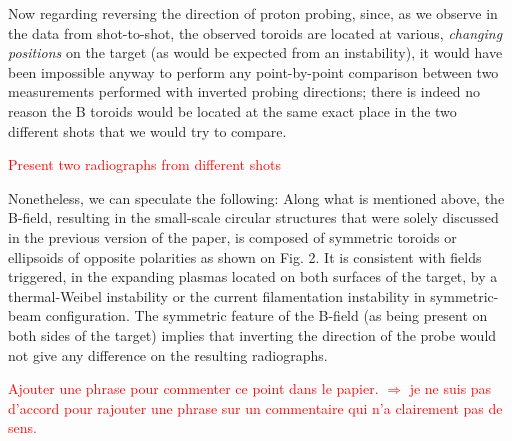 \documentclass{article}
\begin{document}
\begin{enumerate}
Now regarding  reversing the direction of proton probing,
%
since, as we observe in the data from shot-to-shot, the observed toroids are located at various, \emph{changing positions} on the target (as would be expected from an instability), it would have been impossible anyway to perform any point-by-point comparison between two measurements performed with inverted probing directions; there is indeed no reason the B toroids would be located at the same exact place in the two different shots that we would try to compare.

\textcolor{red}{Present two radiographs from different shots}

Nonetheless, we can speculate the following: Along what is mentioned above, the B-field, resulting in the small-scale circular structures that were solely discussed in the previous version of the paper, is composed of symmetric toroids or ellipsoids of opposite polarities as shown on Fig. 2. 
It is consistent with fields triggered, in the expanding plasmas located on both surfaces of the target, by a thermal-Weibel instability or the current filamentation instability in symmetric-beam configuration. 
The symmetric feature of the B-field (as being present on both sides of the target) implies that inverting the direction of the probe would not give any difference on the resulting radiographs.

\textcolor{red}{
Ajouter une phrase pour commenter ce point dans le papier. $\Rightarrow$  je ne suis pas d'accord pour rajouter une phrase sur un commentaire qui n'a clairement pas de sens.
}


\end{enumerate}
\end{document}
